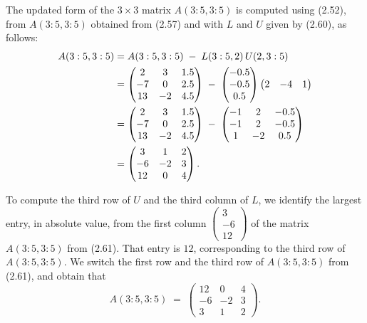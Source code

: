 The updated form of the $3\times 3$ matrix $A(3:5,3:5)$ is computed using
(2.52), from $A(3:5,3:5)$ obtained from (2.57) and with $L$ and $U$ given by
(2.60), as follows:
\begin{align}
A(3:5,3:5)
&= A(3:5,3:5) \;-\; L(3:5,2)\, U(2,3:5) \notag\\
&= \begin{pmatrix} 2 & 3 & 1.5\\ -7 & 0 & 2.5\\ 13 & -2 & 4.5 \end{pmatrix}
\;-\;
\begin{pmatrix} -0.5\\ -0.5\\ 0.5 \end{pmatrix}
\begin{pmatrix} 2 & -4 & 1 \end{pmatrix} \notag\\
&= \begin{pmatrix} 2 & 3 & 1.5\\ -7 & 0 & 2.5\\ 13 & -2 & 4.5 \end{pmatrix}
\;-\;
\begin{pmatrix} -1 & 2 & -0.5\\ -1 & 2 & -0.5\\ 1 & -2 & 0.5 \end{pmatrix} \notag\\
&= \begin{pmatrix} 3 & 1 & 2\\ -6 & -2 & 3\\ 12 & 0 & 4 \end{pmatrix}.
\end{align}

To compute the third row of $U$ and the third column of $L$, we identify the
largest entry, in absolute value, from the first column
$\begin{pmatrix} 3\\ -6\\ 12 \end{pmatrix}$ of the matrix $A(3:5,3:5)$
from (2.61). That entry is $12$, corresponding to the third row of
$A(3:5,3:5)$. We switch the first row and the third row of $A(3:5,3:5)$ from
(2.61), and obtain that
\begin{equation}
A(3:5,3:5) \;=\; \begin{pmatrix} 12 & 0 & 4\\ -6 & -2 & 3\\ 3 & 1 & 2 \end{pmatrix}.
\end{equation}

